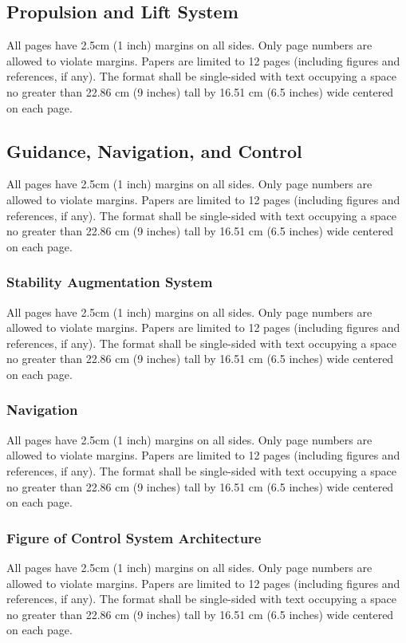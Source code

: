 \documentclass[12pt, letterpaper]{article}
\begin{document}
\subsection{Propulsion and Lift System}
All pages have 2.5cm (1 inch) margins on all sides. Only page numbers are allowed to violate margins. Papers are limited to 12 pages (including figures and references, if any). The format shall be single-sided with text occupying a space no greater than 22.86 cm (9 inches) tall by 16.51 cm (6.5 inches) wide centered on each page.

\subsection{Guidance, Navigation, and Control}
All pages have 2.5cm (1 inch) margins on all sides. Only page numbers are allowed to violate margins. Papers are limited to 12 pages (including figures and references, if any). The format shall be single-sided with text occupying a space no greater than 22.86 cm (9 inches) tall by 16.51 cm (6.5 inches) wide centered on each page.

\subsubsection{Stability Augmentation System}
All pages have 2.5cm (1 inch) margins on all sides. Only page numbers are allowed to violate margins. Papers are limited to 12 pages (including figures and references, if any). The format shall be single-sided with text occupying a space no greater than 22.86 cm (9 inches) tall by 16.51 cm (6.5 inches) wide centered on each page.

\subsubsection{Navigation}
All pages have 2.5cm (1 inch) margins on all sides. Only page numbers are allowed to violate margins. Papers are limited to 12 pages (including figures and references, if any). The format shall be single-sided with text occupying a space no greater than 22.86 cm (9 inches) tall by 16.51 cm (6.5 inches) wide centered on each page.

\subsubsection{Figure of Control System Architecture}
All pages have 2.5cm (1 inch) margins on all sides. Only page numbers are allowed to violate margins. Papers are limited to 12 pages (including figures and references, if any). The format shall be single-sided with text occupying a space no greater than 22.86 cm (9 inches) tall by 16.51 cm (6.5 inches) wide centered on each page.
\end{document}
